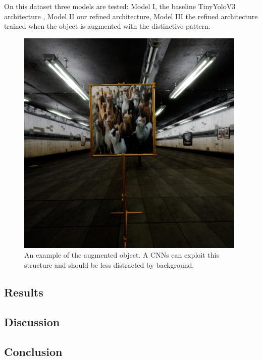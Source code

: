 	On this dataset three models are tested: Model I, the baseline TinyYoloV3 architecture , Model II our refined architecture, Model III the refined architecture trained when the object is augmented with the distinctive pattern.
	
		\begin{figure}
		\includegraphics[width=\textwidth]{fig/cats}
		\caption{An example of the augmented object. A \acp{CNN} can exploit this structure and should be less distracted by background.}
		\label{fig:cats}
	\end{figure}
	
	\subsection{Results}

	\subsection{Discussion}
	
	\subsection{Conclusion}
	
	
